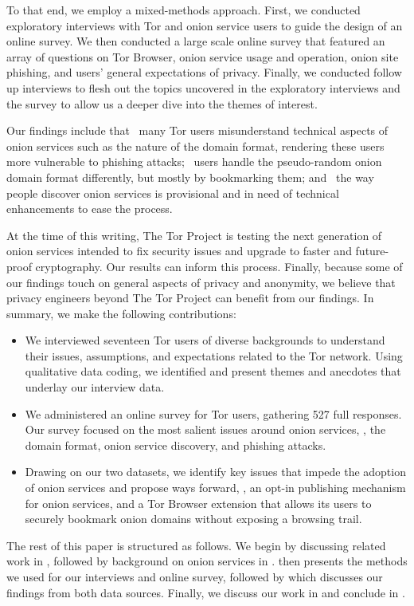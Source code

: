 To that end, we employ a mixed-methods approach. First, we conducted exploratory interviews with Tor and onion service users to guide the design of an online survey. We then conducted a large scale online survey that featured an array of questions on Tor Browser, onion service usage and operation, onion site
phishing, and users' general expectations of privacy. Finally, we conducted follow up interviews to flesh out the topics uncovered in the exploratory interviews and the survey to allow us a deeper dive into the themes of interest.

Our findings include that \first~many Tor users misunderstand technical aspects
of onion services such as the nature of the domain format, rendering these users
more vulnerable to phishing attacks; \second~users handle the pseudo-random
onion domain format differently, but mostly by bookmarking them; and \third~the
way people discover onion services is provisional and in need of technical
enhancements to ease the process.

At the time of this writing, The Tor Project is testing the next generation of
onion services intended to fix security issues and upgrade to faster and
future-proof cryptography.  Our results can inform this process.
Finally, because some of our findings touch on general aspects of privacy and
anonymity, we believe that privacy engineers beyond The Tor Project can benefit
from our findings.  In summary, we make the following contributions:

\begin{itemize}
    \item We interviewed seventeen Tor users of diverse backgrounds to
        understand their issues, assumptions, and expectations related to the
        Tor network.  Using qualitative data coding, we identified and present
        themes and anecdotes that underlay our interview data.

    \item We administered an online survey for Tor users, gathering 527 full
        responses.  Our survey focused on the most salient issues around onion
        services, \ie, the domain format, onion service discovery, and phishing
        attacks.

    \item Drawing on our two datasets, we identify key issues that impede the
        adoption of onion services and propose ways forward, \eg, an opt-in
        publishing mechanism for onion services, and a Tor Browser extension
        that allows its users to securely bookmark onion domains without
        exposing a browsing trail.
\end{itemize}

The rest of this paper is structured as follows.  We begin by discussing related
work in , followed by background on onion services in
.   then presents the methods we used for
our interviews and online survey, followed by  which discusses
our findings from both data sources.  Finally, we discuss our work in
 and conclude in .
